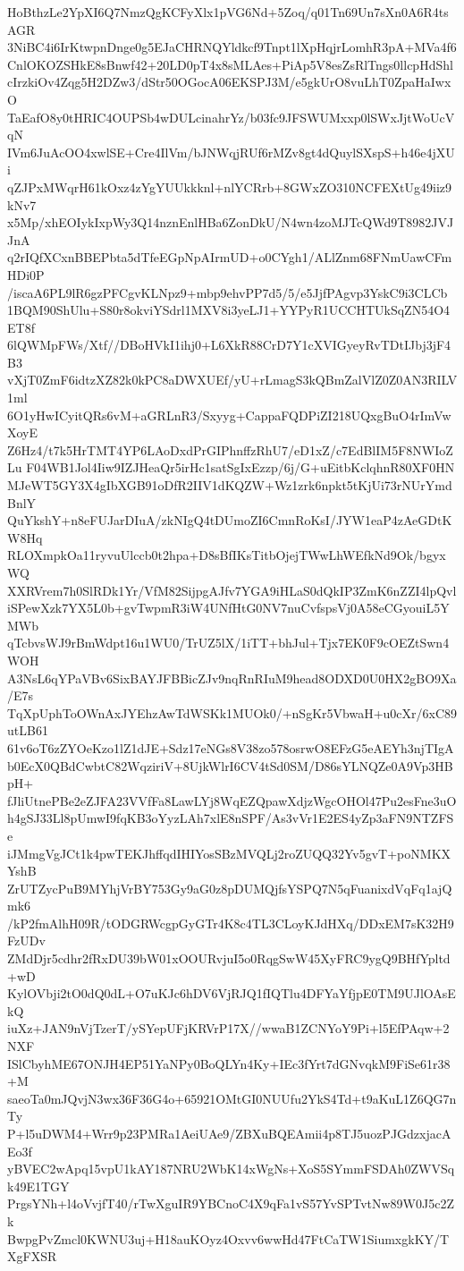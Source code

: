 HoBthzLe2YpXI6Q7NmzQgKCFyXlx1pVG6Nd+5Zoq/q01Tn69Un7sXn0A6R4tsAGR
3NiBC4i6IrKtwpnDnge0g5EJaCHRNQYldkcf9Tnpt1lXpHqjrLomhR3pA+MVa4f6
CnlOKOZSHkE8sBnwf42+20LD0pT4x8sMLAes+PiAp5V8esZsRlTngs0llcpHdShl
cIrzkiOv4Zqg5H2DZw3/dStr50OGocA06EKSPJ3M/e5gkUrO8vuLhT0ZpaHaIwxO
TaEafO8y0tHRIC4OUPSb4wDULcinahrYz/b03fc9JFSWUMxxp0lSWxJjtWoUcVqN
IVm6JuAcOO4xwlSE+Cre4IlVm/bJNWqjRUf6rMZv8gt4dQuylSXspS+h46e4jXUi
qZJPxMWqrH61kOxz4zYgYUUkkknl+nlYCRrb+8GWxZO310NCFEXtUg49iiz9kNv7
x5Mp/xhEOIykIxpWy3Q14nznEnlHBa6ZonDkU/N4wn4zoMJTcQWd9T8982JVJJnA
q2rIQfXCxnBBEPbta5dTfeEGpNpAIrmUD+o0CYgh1/ALlZnm68FNmUawCFmHDi0P
/iscaA6PL9lR6gzPFCgvKLNpz9+mbp9ehvPP7d5/5/e5JjfPAgvp3YskC9i3CLCb
1BQM90ShUlu+S80r8okviYSdrl1MXV8i3yeLJ1+YYPyR1UCCHTUkSqZN54O4ET8f
6lQWMpFWs/Xtf//DBoHVkI1ihj0+L6XkR88CrD7Y1cXVIGyeyRvTDtIJbj3jF4B3
vXjT0ZmF6idtzXZ82k0kPC8aDWXUEf/yU+rLmagS3kQBmZalVlZ0Z0AN3RILV1ml
6O1yHwICyitQRs6vM+aGRLnR3/Sxyyg+CappaFQDPiZI218UQxgBuO4rImVwXoyE
Z6Hz4/t7k5HrTMT4YP6LAoDxdPrGIPhnffzRhU7/eD1xZ/c7EdBlIM5F8NWIoZLu
F04WB1Jol4Iiw9IZJHeaQr5irHc1satSgIxEzzp/6j/G+uEitbKclqhnR80XF0HN
MJeWT5GY3X4gIbXGB91oDfR2IIV1dKQZW+Wz1zrk6npkt5tKjUi73rNUrYmdBnlY
QuYkshY+n8eFUJarDIuA/zkNIgQ4tDUmoZI6CmnRoKsI/JYW1eaP4zAeGDtKW8Hq
RLOXmpkOa11ryvuUlccb0t2hpa+D8sBfIKsTitbOjejTWwLhWEfkNd9Ok/bgyxWQ
XXRVrem7h0SlRDk1Yr/VfM82SijpgAJfv7YGA9iHLaS0dQkIP3ZmK6nZZI4lpQvl
iSPewXzk7YX5L0b+gvTwpmR3iW4UNfHtG0NV7nuCvfspsVj0A58eCGyouiL5YMWb
qTcbvsWJ9rBmWdpt16u1WU0/TrUZ5lX/1iTT+bhJul+Tjx7EK0F9cOEZtSwn4WOH
A3NsL6qYPaVBv6SixBAYJFBBicZJv9nqRnRIuM9head8ODXD0U0HX2gBO9Xa/E7s
TqXpUphToOWnAxJYEhzAwTdWSKk1MUOk0/+nSgKr5VbwaH+u0cXr/6xC89utLB61
61v6oT6zZYOeKzo1lZ1dJE+Sdz17eNGs8V38zo578osrwO8EFzG5eAEYh3njTIgA
b0EcX0QBdCwbtC82WqziriV+8UjkWlrI6CV4tSd0SM/D86sYLNQZe0A9Vp3HBpH+
fJliUtnePBe2eZJFA23VVfFa8LawLYj8WqEZQpawXdjzWgcOHOl47Pu2esFne3uO
h4gSJ33Ll8pUmwI9fqKB3oYyzLAh7xlE8nSPF/As3vVr1E2ES4yZp3aFN9NTZFSe
iJMmgVgJCt1k4pwTEKJhffqdIHIYosSBzMVQLj2roZUQQ32Yv5gvT+poNMKXYshB
ZrUTZycPuB9MYhjVrBY753Gy9aG0z8pDUMQjfsYSPQ7N5qFuanixdVqFq1ajQmk6
/kP2fmAlhH09R/tODGRWcgpGyGTr4K8c4TL3CLoyKJdHXq/DDxEM7sK32H9FzUDv
ZMdDjr5cdhr2fRxDU39bW01xOOURvjuI5o0RqgSwW45XyFRC9ygQ9BHfYpltd+wD
KylOVbji2tO0dQ0dL+O7uKJc6hDV6VjRJQ1fIQTlu4DFYaYfjpE0TM9UJlOAsEkQ
iuXz+JAN9nVjTzerT/ySYepUFjKRVrP17X//wwaB1ZCNYoY9Pi+l5EfPAqw+2NXF
ISlCbyhME67ONJH4EP51YaNPy0BoQLYn4Ky+IEc3fYrt7dGNvqkM9FiSe61r38+M
saeoTa0mJQvjN3wx36F36G4o+65921OMtGI0NUUfu2YkS4Td+t9aKuL1Z6QG7nTy
P+l5uDWM4+Wrr9p23PMRa1AeiUAe9/ZBXuBQEAmii4p8TJ5uozPJGdzxjacAEo3f
yBVEC2wApq15vpU1kAY187NRU2WbK14xWgNs+XoS5SYmmFSDAh0ZWVSqk49E1TGY
PrgsYNh+l4oVvjfT40/rTwXguIR9YBCnoC4X9qFa1vS57YvSPTvtNw89W0J5c2Zk
BwpgPvZmcl0KWNU3uj+H18auKOyz4Oxvv6wwHd47FtCaTW1SiumxgkKY/TXgFXSR

